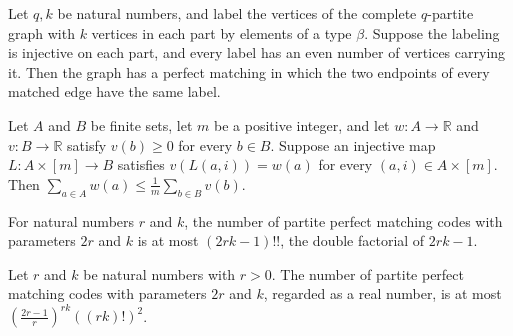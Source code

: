 \begin{theorem}
\label{FABL.exists_graphPartitePerfectMatching_compatible}
\leanok
{}
Let $q,k$ be natural numbers, and label the vertices of the complete $q$-partite graph
with $k$ vertices in each part by elements of a type $\beta$. Suppose the labeling is
injective on each part, and every label has an even number of vertices carrying it. Then
the graph has a perfect matching in which the two endpoints of every matched edge have
the same label.
\end{theorem}

\begin{theorem}
\label{FABL.sum_le_inv_mul_sum_of_injective_lifts}
\leanok
{}
Let $A$ and $B$ be finite sets, let $m$ be a positive integer, and let $w:A\to\mathbb R$
and $v:B\to\mathbb R$ satisfy $v(b)\ge0$ for every $b\in B$. Suppose an injective map
$L:A\times[m]\to B$ satisfies $v(L(a,i))=w(a)$ for every $(a,i)\in A\times[m]$. Then
$\sum_{a\in A}w(a)\le \frac1m\sum_{b\in B}v(b)$.
\end{theorem}

\begin{theorem}
\label{FABL.natCard_partitePerfectMatching_le_doubleFactorial}
\leanok
{}
For natural numbers $r$ and $k$, the number of partite perfect matching codes with
parameters $2r$ and $k$ is at most $(2rk-1)!!$, the double factorial of $2rk-1$.
\end{theorem}

\begin{theorem}
\label{FABL.natCard_partitePerfectMatching_le_factorial_bound}
\leanok
{}
Let $r$ and $k$ be natural numbers with $r>0$. The number of partite perfect matching
codes with parameters $2r$ and $k$, regarded as a real number, is at most
$\left(\frac{2r-1}{r}\right)^{rk}((rk)!)^2$.
\end{theorem}

